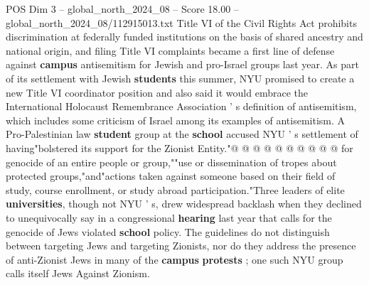 \begin{textsample}{POS Dim 3 – global\_north\_2024\_08 – Score 18.00 – global\_north\_2024\_08/112915013.txt}
Title VI of the Civil Rights Act prohibits discrimination at federally funded institutions on the basis of shared ancestry and national origin, and filing Title VI complaints became a first line of defense against \textbf{campus} antisemitism for Jewish and pro-Israel groups last year.
As part of its settlement with Jewish \textbf{students} this summer, NYU promised to create a new Title VI coordinator position and also said it would embrace the International Holocaust Remembrance Association ' s definition of antisemitism, which includes some criticism of Israel among its examples of antisemitism.
A Pro-Palestinian law \textbf{student} group at the \textbf{school} accused NYU ' s settlement of having"bolstered its support for the Zionist Entity."@ @ @ @ @ @ @ @ @ @ for genocide of an entire people or group,""use or dissemination of tropes about protected groups,"and"actions taken against someone based on their field of study, course enrollment, or study abroad participation."Three leaders of elite \textbf{universities}, though not NYU ' s, drew widespread backlash when they declined to unequivocally say in a congressional \textbf{hearing} last year that calls for the genocide of Jews violated \textbf{school} policy.
The guidelines do not distinguish between targeting Jews and targeting Zionists, nor do they address the presence of anti-Zionist Jews in many of the \textbf{campus} \textbf{protests} ; one such NYU group calls itself Jews Against Zionism.

\end{textsample}
